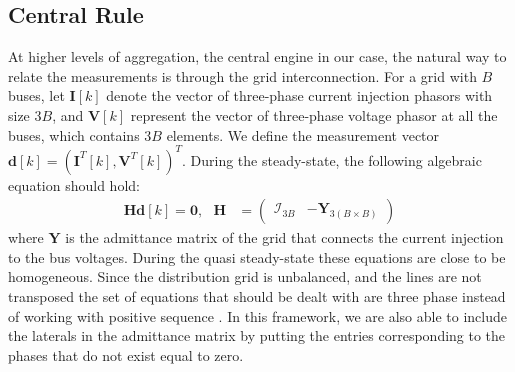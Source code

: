 \documentclass[twocolumn]{IEEEtran}
\newcommand{\bs}{\boldsymbol}
\begin{document}
\subsection{Central Rule}\label{sec.stage-i}
At higher levels of aggregation, the central engine in our case, the natural way to relate the measurements is through the grid interconnection. 
For a grid with $B$ buses, let $\mathbf{I}[k]$ denote the vector of three-phase current injection phasors with size $3B$, and $\mathbf{V}[k]$ represent the vector of three-phase voltage phasor at all the buses, which contains $3B$ elements. We define the measurement vector $\mathbf{d}[k]=(\mathbf{I}^T[k],\mathbf{V}^T[k])^T$.
During the steady-state, the following algebraic equation should hold:
\begin{align}
\mathbf{H}\mathbf{d}[k]
=\mathbf{0},~~~ 
\mathbf{H}&=\left( \begin{array}{c|c}
\mathcal{I}_{3B}  &-\bs{Y}_{3(B \times B)}
\end{array} \right)
\label{eq:grid_homogen}
\end{align} 
where $\bs{Y}$ is the admittance matrix of the grid that connects the current injection to the bus voltages. During the quasi steady-state these equations are close to be homogeneous. Since the distribution grid is unbalanced, and the lines are not transposed the set of equations that should be dealt with are three phase instead of working with positive sequence \cite{kersting2012distribution}. In this framework, we are also able to include the laterals in the admittance matrix by putting the entries corresponding to the phases that do not exist equal to zero.  
\end{document}
